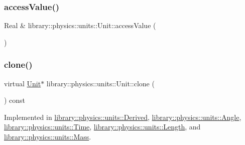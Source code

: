 \subsubsection{\texorpdfstring{access\+Value()}{accessValue()}\hspace{0.1cm}{\footnotesize\ttfamily [2/2]}}
{\footnotesize\ttfamily Real \& library\+::physics\+::units\+::\+Unit\+::access\+Value (\begin{DoxyParamCaption}{ }\end{DoxyParamCaption})}

\mbox{\label{classlibrary_1_1physics_1_1units_1_1_unit_aff727141d73acddfae382e5e375f4640}} 
\subsubsection{\texorpdfstring{clone()}{clone()}}
{\footnotesize\ttfamily virtual \hyperlink{classlibrary_1_1physics_1_1units_1_1_unit}{Unit}$\ast$ library\+::physics\+::units\+::\+Unit\+::clone (\begin{DoxyParamCaption}{ }\end{DoxyParamCaption}) const\hspace{0.3cm}{\ttfamily [pure virtual]}}



Implemented in \hyperlink{classlibrary_1_1physics_1_1units_1_1_derived_a6328e9f5bcf35f1c587c20f9c3fdb497}{library\+::physics\+::units\+::\+Derived}, \hyperlink{classlibrary_1_1physics_1_1units_1_1_angle_add51af263128e384d3d89827d0f70dcf}{library\+::physics\+::units\+::\+Angle}, \hyperlink{classlibrary_1_1physics_1_1units_1_1_time_a8745ebee6707751e91137c3e87782b59}{library\+::physics\+::units\+::\+Time}, \hyperlink{classlibrary_1_1physics_1_1units_1_1_length_ae06162cf9f3d140a3b53e156a4cb3309}{library\+::physics\+::units\+::\+Length}, and \hyperlink{classlibrary_1_1physics_1_1units_1_1_mass_a7a09438b05edbe4b21a05ec234a6372f}{library\+::physics\+::units\+::\+Mass}.

\mbox{\label{classlibrary_1_1physics_1_1units_1_1_unit_a4f4e6ba62e833324970a06c29685488a}} 
